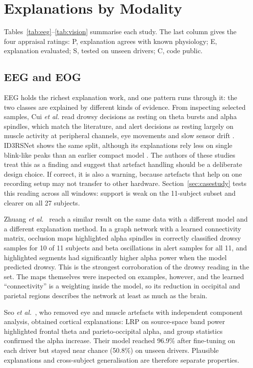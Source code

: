 \section{Explanations by Modality}
\label{sec:modalities}

Tables~\ref{tab:eeg}--\ref{tab:vision} summarise each study. The last column gives the four appraisal ratings: P, explanation agrees with known physiology; E, explanation evaluated; S, tested on unseen drivers; C, code public.

\subsection{EEG and EOG}
EEG holds the richest explanation work, and one pattern runs through it: the two classes are explained by different kinds of evidence. From inspecting selected samples, Cui \textit{et al.} read drowsy decisions as resting on theta bursts and alpha spindles, which match the literature, and alert decisions as resting largely on muscle activity at peripheral channels, eye movements and slow sensor drift \cite{cui2022eeg,cui2022compact,cui2021subject}. ID3RSNet shows the same split, although its explanations rely less on single blink-like peaks than an earlier compact model \cite{feng2025id3rsnet}. The authors of these studies treat this as a finding and suggest that artefact handling should be a deliberate design choice. If correct, it is also a warning, because artefacts that help on one recording setup may not transfer to other hardware. Section~\ref{sec:casestudy} tests this reading across all windows: support is weak on the 11-subject subset and clearer on all 27 subjects.

Zhuang \textit{et al.}~\cite{zhuang2024connectivity} reach a similar result on the same data with a different model and a different explanation method. In a graph network with a learned connectivity matrix, occlusion maps highlighted alpha spindles in correctly classified drowsy samples for 10 of 11 subjects and beta oscillations in alert samples for all 11, and highlighted segments had significantly higher alpha power when the model predicted drowsy. This is the strongest corroboration of the drowsy reading in the set. The maps themselves were inspected on examples, however, and the learned ``connectivity'' is a weighting inside the model, so its reduction in occipital and parietal regions describes the network at least as much as the brain.

Seo \textit{et al.}~\cite{seo2025driver}, who removed eye and muscle artefacts with independent component analysis, obtained cortical explanations: LRP on source-space band power highlighted frontal theta and parieto-occipital alpha, and group statistics confirmed the alpha increase. Their model reached 96.9\% after fine-tuning on each driver but stayed near chance (50.8\%) on unseen drivers. Plausible explanations and cross-subject generalisation are therefore separate properties.

